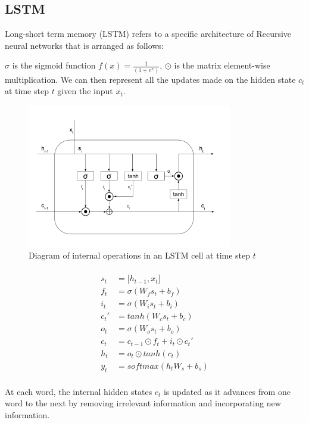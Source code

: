 \documentclass[fyp]{socreport}
\begin{document}
\subsection{LSTM}
Long-short term memory (LSTM) refers to a specific architecture of Recursive
neural networks that is arranged as follows:


$\sigma$ is the sigmoid function $f(x) = \frac{1}{(1 + e^x)}$, $\odot$ is the
matrix element-wise multiplication. We can then represent all the updates
made on the hidden state $c_t$ at time step $t$ given the input $x_t$.
{
\begin{figure}
    \centering
    \includegraphics[width=0.8\textwidth]{LSTM.png}
    \caption{Diagram of internal operations in an LSTM cell at time step $t$}
\end{figure}

\begin{align*}
  \\
  s_t &= \lbrack h_{t-1}, x_{t} \rbrack \\
  f_t &= \sigma \left( W_f s_t + b_f \right) \\
  i_t &= \sigma \left( W_i s_t + b_i \right) \\
  c_t' &= tanh \left( W_c s_t + b_c \right) \\
  o_t &= \sigma \left( W_o s_t + b_o \right) \\
  c_t &= c_{t-1} \odot f_t + i_t \odot c_t' \\
  h_t &= o_t \odot tanh \left( c_t \right) \\
  y_t &= softmax \left( h_t W_s + b_s \right) \\
\end{align*}
}

At each word, the internal hidden states $c_t$ is updated as it advances from
one word to the next by removing irrelevant information and incorporating
new information.
\end{document}
